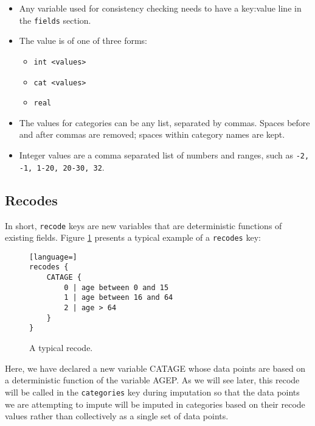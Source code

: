 \documentclass{article}
\begin{document}
\begin{itemize}
\item Any variable used for consistency checking needs to have a key:value line in the
{\tt fields} section.
\item The value is of one of three forms:
    \begin{itemize}
    \item {\tt int <values>}
    \item {\tt cat <values>}
    \item {\tt real}
    \end{itemize}
\item The values for categories can be any list, separated by commas. Spaces before and
after commas are removed; spaces within category names are kept. 
\item Integer values are a comma separated list of numbers and ranges, such as {\tt -2, -1, 1-20, 20-30, 32}.
\end{itemize}

%

\subsection{Recodes}
In short, {\tt recode} keys are new variables that are deterministic functions of 
existing fields. Figure \ref{basicrecode} presents a typical example of a {\tt recodes} key:

\begin{figure}
\begin{lstlisting}[language=]
recodes {
    CATAGE {
        0 | age between 0 and 15
        1 | age between 16 and 64
        2 | age > 64
    }
}
\end{lstlisting}
\caption{A typical recode.}\label{basicrecode}
\end{figure}

Here, we have declared a new variable CATAGE whose data points are based on a
deterministic function of the variable AGEP. As we will see later, this recode will
be called in the {\tt categories} key during imputation so that the data points we
are attempting to impute will be imputed in categories based on their recode values
rather than collectively as a single set of data points.
\end{document}
